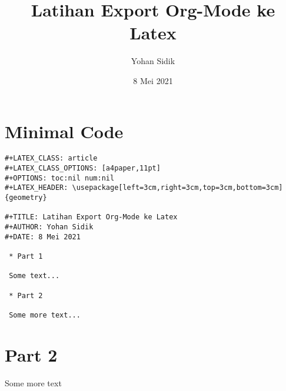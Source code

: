\documentclass[a4paper,11pt]{article}
\author{Yohan Sidik}
\date{8 Mei 2021}
\title{Latihan Export Org-Mode ke Latex}
\begin{document}
\maketitle

\section*{Minimal Code}
\label{sec:org829b228}

\begin{verbatim}
#+LATEX_CLASS: article
#+LATEX_CLASS_OPTIONS: [a4paper,11pt]
#+OPTIONS: toc:nil num:nil
#+LATEX_HEADER: \usepackage[left=3cm,right=3cm,top=3cm,bottom=3cm]{geometry}

#+TITLE: Latihan Export Org-Mode ke Latex
#+AUTHOR: Yohan Sidik
#+DATE: 8 Mei 2021

 * Part 1

 Some text...

 * Part 2

 Some more text...

\end{verbatim}



\section*{Part 2}
\label{sec:org2a7eda6}

Some more text
\end{document}
